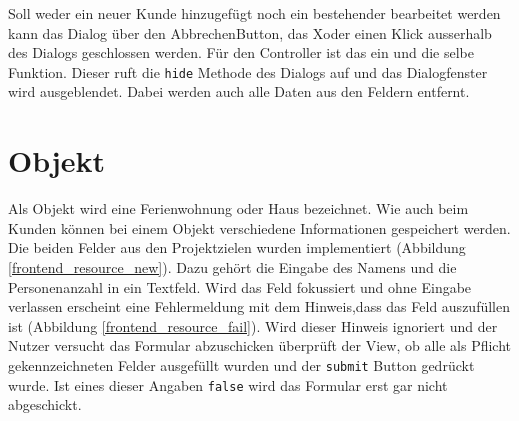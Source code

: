 Soll weder ein neuer Kunde hinzugefügt noch ein bestehender bearbeitet werden kann das Dialog über den \grqq Abbrechen\glqq  Button, das \grqq X\glqq  oder einen Klick ausserhalb des Dialogs geschlossen werden. Für den Controller ist das ein und die selbe Funktion. Dieser ruft die \texttt{hide} Methode des Dialogs auf und das Dialogfenster wird ausgeblendet. Dabei werden auch alle Daten aus den Feldern entfernt.


\section{Objekt}
Als Objekt wird eine Ferienwohnung oder Haus bezeichnet. Wie auch beim Kunden können bei einem Objekt verschiedene Informationen gespeichert werden. Die beiden Felder aus den Projektzielen wurden implementiert (Abbildung \ref{frontend_resource_new}). Dazu gehört die Eingabe des Namens und die Personenanzahl in ein Textfeld. Wird das Feld fokussiert und ohne Eingabe verlassen erscheint eine Fehlermeldung mit dem Hinweis,dass das Feld auszufüllen ist (Abbildung \ref{frontend_resource_fail}). Wird dieser Hinweis ignoriert und der Nutzer versucht das Formular abzuschicken überprüft der View, ob alle als Pflicht gekennzeichneten Felder ausgefüllt wurden und der \texttt{submit} Button gedrückt wurde. Ist eines dieser Angaben \texttt{false} wird das Formular erst gar nicht abgeschickt.

